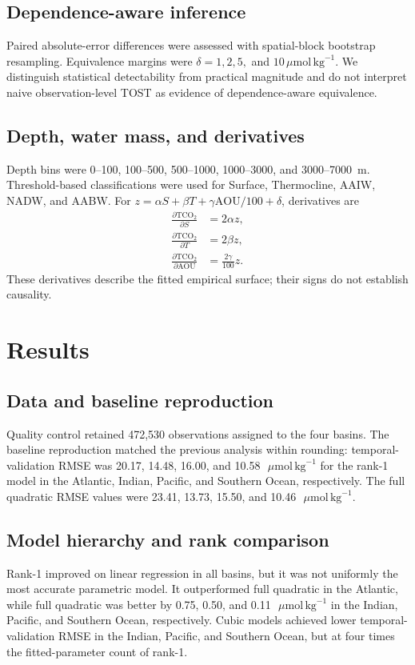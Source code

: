 \documentclass[12pt,a4paper]{article}
\newcommand{\tco}{\mathrm{TCO_2}}
\newcommand{\aou}{\mathrm{AOU}}
\newcommand{\umol}{\,\mu\mathrm{mol}\,\mathrm{kg}^{-1}}
\begin{document}
\subsection{Dependence-aware inference}
Paired absolute-error differences were assessed with spatial-block bootstrap resampling. Equivalence margins were $\delta=1,2,5,$ and $10\umol$. We distinguish statistical detectability from practical magnitude and do not interpret naive observation-level TOST as evidence of dependence-aware equivalence.

\subsection{Depth, water mass, and derivatives}
Depth bins were 0--100, 100--500, 500--1000, 1000--3000, and 3000--7000~m. Threshold-based classifications were used for Surface, Thermocline, AAIW, NADW, and AABW. For $z=\alpha S+\beta T+\gamma\aou/100+\delta$, derivatives are
\begin{align}
\frac{\partial\tco}{\partial S}&=2\alpha z,\\
\frac{\partial\tco}{\partial T}&=2\beta z,\\
\frac{\partial\tco}{\partial\aou}&=\frac{2\gamma}{100}z.
\end{align}
These derivatives describe the fitted empirical surface; their signs do not establish causality.



\section{Results}
\subsection{Data and baseline reproduction}
Quality control retained 472,530 observations assigned to the four basins. The baseline reproduction matched the previous analysis within rounding: temporal-validation RMSE was 20.17, 14.48, 16.00, and 10.58~$\umol$ for the rank-1 model in the Atlantic, Indian, Pacific, and Southern Ocean, respectively. The full quadratic RMSE values were 23.41, 13.73, 15.50, and 10.46~$\umol$.

\subsection{Model hierarchy and rank comparison}
Rank-1 improved on linear regression in all basins, but it was not uniformly the most accurate parametric model. It outperformed full quadratic in the Atlantic, while full quadratic was better by 0.75, 0.50, and 0.11~$\umol$ in the Indian, Pacific, and Southern Ocean, respectively. Cubic models achieved lower temporal-validation RMSE in the Indian, Pacific, and Southern Ocean, but at four times the fitted-parameter count of rank-1.
\end{document}
